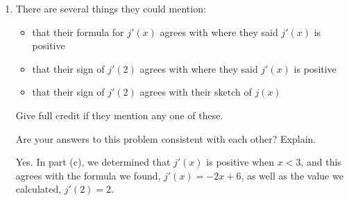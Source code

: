 \documentclass{article}
\providecommand{\check}{}
\renewcommand{\check}{\ifmmode{\text{ \ding{51} }}\else{\ding{51} }\fi}
\begin{document}
\begin{enumerate}
\begin{enumerate}
    \begin{problem}[\stretch{0.25}]
      Use your answer to \ref{shifted-quadratic-j'} to find $j'(2)$. 
    \end{problem}

    \begin{solution}
      $j'(2) = -2(2)+6 = 2$. 
    \end{solution}

  \item

    \begin{grading}
      There are several things they could mention:
      \begin{itemize}[nosep]
      \item that their formula for $j'(x)$ agrees with where they said $j'(x)$ is positive
      \item that their sign of $j'(2)$ agrees with where they said $j'(x)$ is positive
      \item that their sign of $j'(2)$ agrees with their sketch of $j(x)$
      \end{itemize}
      Give full credit if they mention any one of these.
    \end{grading}

    \begin{problem}[\stretch{0.5}]
      \check Are your answers to this problem consistent with each other? Explain.
    \end{problem}

    \begin{solution}
      Yes. In part (c), we determined that $j'(x)$ is positive when $x<3$, and this agrees with the formula
      we found, $j'(x) = -2x+6$, as well as the value we calculated, $j'(2) = 2$. 
    \end{solution}

  \end{enumerate}


\end{enumerate}
\end{document}
